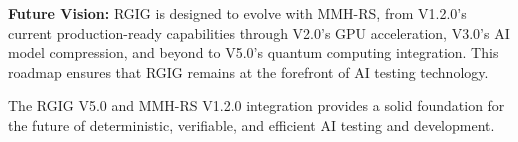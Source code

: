 \documentclass[12pt,a4paper]{article}
\begin{document}
\textbf{Future Vision:}
RGIG is designed to evolve with MMH-RS, from V1.2.0's current production-ready capabilities through V2.0's GPU acceleration, V3.0's AI model compression, and beyond to V5.0's quantum computing integration. This roadmap ensures that RGIG remains at the forefront of AI testing technology.

The RGIG V5.0 and MMH-RS V1.2.0 integration provides a solid foundation for the future of deterministic, verifiable, and efficient AI testing and development.
\end{document}
